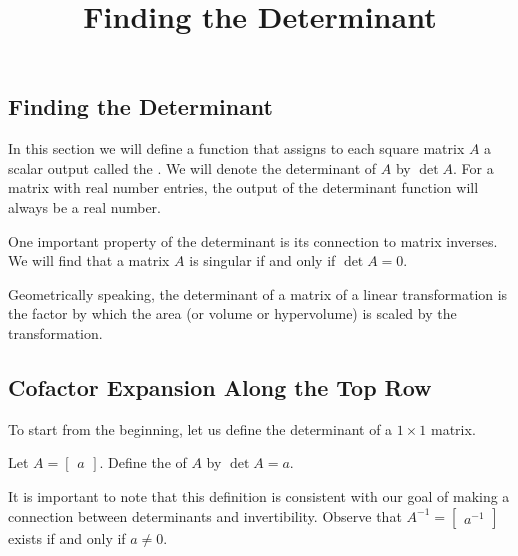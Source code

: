 \documentclass{ximera}
\title{Finding the Determinant} \license{CC BY-NC-SA 4.0}
\begin{document}
\begin{abstract}

\end{abstract}
\maketitle

\begin{onlineOnly}
\section*{Finding the Determinant}
\end{onlineOnly}

In this section we will define a function that assigns to each square matrix $A$ a scalar output called the .  We will denote the determinant of $A$ by $\det{A}$.  For a matrix with real number entries, the output of the determinant function will always be a real number.

One important property of the determinant is its connection to matrix inverses.  We will find that a matrix $A$ is singular if and only if $\det{A}=0$.  %

Geometrically speaking, the determinant of a matrix of a linear transformation is the factor by which the area (or volume or hypervolume) is scaled by the transformation.  %

\subsection*{Cofactor Expansion Along the Top Row}
To start from the beginning, let us define the determinant of a $1\times 1$ matrix.

\begin{definition}\label{def:onebyonedet} Let
$A=\begin{bmatrix}a\end{bmatrix}$.  Define the  of $A$ by $\det{A}=a$.
\end{definition}
It is important to note that this definition is consistent with our goal of making a connection between determinants and invertibility.  Observe that $A^{-1}=\begin{bmatrix}a^{-1}\end{bmatrix}$ exists if and only if $a\neq 0$.
\end{document}
